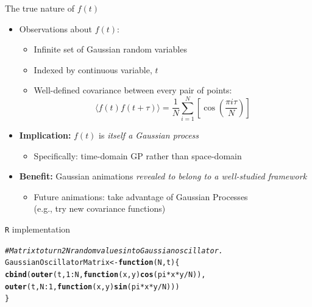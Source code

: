 \documentclass[final,t]{beamer}\usepackage[]{graphicx}\usepackage[]{color}
\makeatletter
\newcommand{\hlnum}[1]{\textcolor[rgb]{0.686,0.059,0.569}{#1}}%
\newcommand{\hlcom}[1]{\textcolor[rgb]{0.678,0.584,0.686}{\textit{#1}}}%
\newcommand{\hlopt}[1]{\textcolor[rgb]{0,0,0}{#1}}%
\newcommand{\hlstd}[1]{\textcolor[rgb]{0.345,0.345,0.345}{#1}}%
\newcommand{\hlkwa}[1]{\textcolor[rgb]{0.161,0.373,0.58}{\textbf{#1}}}%
\newcommand{\hlkwb}[1]{\textcolor[rgb]{0.69,0.353,0.396}{#1}}%
\newcommand{\hlkwc}[1]{\textcolor[rgb]{0.333,0.667,0.333}{#1}}%
\newcommand{\hlkwd}[1]{\textcolor[rgb]{0.737,0.353,0.396}{\textbf{#1}}}%
\newenvironment{kframe}{%
 \def\at@end@of@kframe{}%
 \ifinner\ifhmode%
  \def\at@end@of@kframe{\end{minipage}}%
  \begin{minipage}{\columnwidth}%
 \fi\fi%
 \def\FrameCommand##1{\hskip\@totalleftmargin \hskip-\fboxsep
 \colorbox{shadecolor}{##1}\hskip-\fboxsep
     \hskip-\linewidth \hskip-\@totalleftmargin \hskip\columnwidth}%
 \MakeFramed {\advance\hsize-\width
   \@totalleftmargin\z@ \linewidth\hsize
   \@setminipage}}%
 {\par\unskip\endMakeFramed%
 \at@end@of@kframe}
\newenvironment{knitrout}{}{} %
\makeatother
\begin{document}
\begin{frame}[fragile]
\begin{columns}[T,onlytextwidth]
\begin{column}{.325\linewidth}
      \begin{block}{The true nature of $f(t)$}
        \begin{itemize}
          \item Observations about $f(t)$:
            \begin{itemize}
              \item Infinite set of Gaussian random variables
              \item Indexed by continuous variable, $t$
              \item Well-defined covariance between every pair of points:
                \begin{equation*}
                  \langle f(t) f(t + \tau) \rangle = \frac{1}{N} \sum_{i=1}^{N}
                  \left[ 
                    \cos \left( \frac{\pi i \tau}{N} \right)
                  \right]
                \end{equation*}
            \end{itemize}
          \item \textbf{Implication:} $f(t)$ is
            \textit{itself a Gaussian process}
            \begin{itemize}
              \item Specifically: time-domain GP rather than space-domain
            \end{itemize}
          \item \textbf{Benefit:} Gaussian animations
            \textit{revealed to belong to a well-studied framework}
            \begin{itemize}
              \item Future animations: take advantage of Gaussian Processes
                \\ (e.g., try new covariance functions)
            \end{itemize}
        \end{itemize}
      \end{block}

      \begin{block}{\texttt{R} implementation}
\begin{knitrout}\tiny
{}\color{fgcolor}\begin{kframe}
\begin{alltt}
\hlcom{# Matrix to turn 2N random values into Gaussian oscillator.}
\hlstd{GaussianOscillatorMatrix} \hlkwb{<-} \hlkwa{function}\hlstd{(}\hlkwc{N}\hlstd{,} \hlkwc{t}\hlstd{) \{}
  \hlkwd{cbind}\hlstd{(}\hlkwd{outer}\hlstd{(t,} \hlnum{1}\hlopt{:}\hlstd{N,} \hlkwa{function}\hlstd{(}\hlkwc{x}\hlstd{,} \hlkwc{y}\hlstd{)} \hlkwd{cos}\hlstd{(pi} \hlopt{*} \hlstd{x} \hlopt{*} \hlstd{y} \hlopt{/} \hlstd{N)),}
        \hlkwd{outer}\hlstd{(t, N}\hlopt{:}\hlnum{1}\hlstd{,} \hlkwa{function}\hlstd{(}\hlkwc{x}\hlstd{,} \hlkwc{y}\hlstd{)} \hlkwd{sin}\hlstd{(pi} \hlopt{*} \hlstd{x} \hlopt{*} \hlstd{y} \hlopt{/} \hlstd{N)))}
\hlstd{\}}
\end{alltt}
\end{kframe}
\end{knitrout}


\end{block}
\end{column}
\end{columns}
\end{frame}
\end{document}
